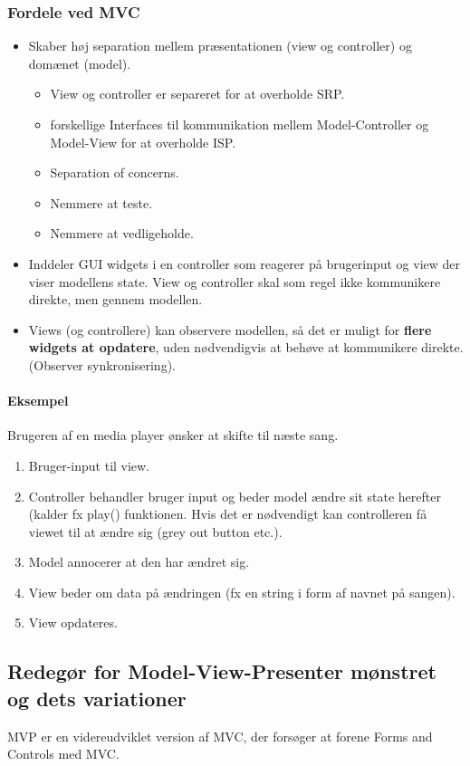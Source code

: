 \subsubsection{Fordele ved MVC}
\begin{itemize}
	\item Skaber høj separation mellem præsentationen (view og controller) og domænet (model).
	\begin{itemize}
		\item View og controller er separeret for at overholde SRP.
		\item forskellige Interfaces til kommunikation mellem Model-Controller og Model-View for at overholde ISP.
		\item Separation of concerns.
		\item Nemmere at teste.
		\item Nemmere at vedligeholde.
	\end{itemize}
	\item Inddeler GUI widgets i en controller som reagerer på brugerinput og view der viser modellens state. View og controller skal som regel ikke kommunikere direkte, men gennem modellen.
	\item Views (og controllere) kan observere modellen, så det er muligt for \textbf{flere widgets at opdatere}, uden nødvendigvis at behøve at kommunikere direkte. (Observer synkronisering).
\end{itemize}

\paragraph{Eksempel}
Brugeren af en media player ønsker at skifte til næste sang.

\begin{enumerate}
	\item Bruger-input til view.
	\item Controller behandler bruger input og beder model ændre sit state herefter (kalder fx play() funktionen. Hvis det er nødvendigt kan controlleren få viewet til at ændre sig (grey out button etc.).
	\item Model annocerer at den har ændret sig.
	\item View beder om data på ændringen (fx en string i form af navnet på sangen).
	\item View opdateres.
\end{enumerate}

\subsection{Redegør for Model-View-Presenter mønstret og dets variationer}
MVP er en videreudviklet version af MVC, der forsøger at forene Forms and Controls med MVC.

